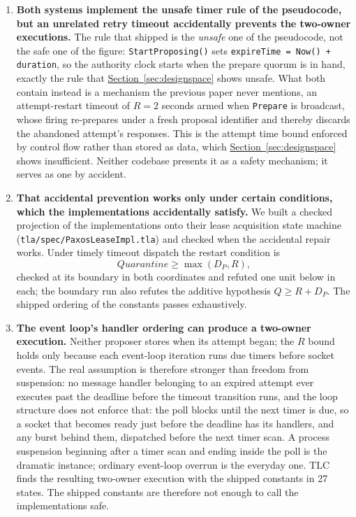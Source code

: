 \documentclass[final,5p,times,twocolumn,number]{elsarticle}
\newcommand{\code}[1]{\texttt{#1}}
\newcommand{\secref}[1]{\hyperref[#1]{Section~\ref*{#1}}}
\begin{document}
\begin{enumerate}\itemsep0.25em
\item \textbf{Both systems implement the unsafe timer rule of the pseudocode, but an unrelated retry timeout accidentally prevents the two-owner executions.}  The rule that shipped is the \emph{unsafe} one of the pseudocode, not the safe one of the figure: \code{StartProposing()} sets \code{expireTime = Now() + duration}, so the authority clock starts when the prepare quorum is in hand, exactly the rule that \secref{sec:designspace} shows unsafe.  What both contain instead is a mechanism the previous paper never mentions, an attempt-restart timeout of $R = 2$ seconds armed when \code{Prepare} is broadcast, whose firing re-prepares under a fresh proposal identifier and thereby discards the abandoned attempt's responses.  This is the attempt time bound enforced by control flow rather than stored as data, which \secref{sec:designspace} shows insufficient.  Neither codebase presents it as a safety mechanism; it serves as one by accident.
\item \textbf{That accidental prevention works only under certain conditions, which the implementations accidentally satisfy.}  We built a checked projection of the implementations onto their lease acquisition state machine (\code{tla/spec/PaxosLeaseImpl.tla}) and checked when the accidental repair works.  Under timely timeout dispatch the restart condition is
\[
  Quarantine \geq \max(D_P, R),
\]
checked at its boundary in both coordinates and refuted one unit below in each; the boundary run also refutes the additive hypothesis $Q \geq R + D_P$.  The shipped ordering of the constants passes exhaustively.
\item \textbf{The event loop's handler ordering can produce a two-owner execution.}  Neither proposer stores when its attempt began; the $R$ bound holds only because each event-loop iteration runs due timers before socket events.  The real assumption is therefore stronger than freedom from suspension: no message handler belonging to an expired attempt ever executes past the deadline before the timeout transition runs, and the loop structure does not enforce that: the poll blocks until the next timer is due, so a socket that becomes ready just before the deadline has its handlers, and any burst behind them, dispatched before the next timer scan.  A process suspension beginning after a timer scan and ending inside the poll is the dramatic instance; ordinary event-loop overrun is the everyday one.  TLC finds the resulting two-owner execution with the shipped constants in 27 states.  The shipped constants are therefore not enough to call the implementations safe.

\end{enumerate}
\end{document}
